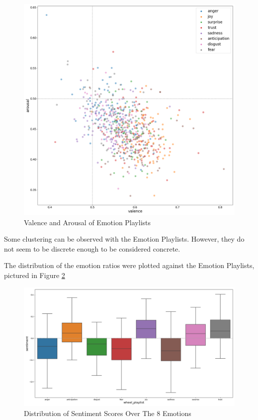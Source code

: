 \documentclass[11pt]{article}
\begin{document}
\begin{figure}[!ht]
  \includegraphics[scale=0.35]{../statics/plots/va_wheel_playlist_False.png}
  \centering
  \caption{Valence and Arousal of Emotion Playlists}
  \label{fig:va_wheel}
\end{figure}
Some clustering can be observed with the Emotion Playlists. However, they do not seem to be discrete enough to be considered concrete.

The distribution of the emotion ratios were plotted against the Emotion Playlists, pictured in Figure \ref{fig:wheel_playlist}

\begin{figure}[!ht]
  \includegraphics[scale=0.42]{../statics/plots/wheel_playlist.png}
  \centering
  \caption{Distribution of Sentiment Scores Over The 8 Emotions}
  \label{fig:wheel_playlist}
\end{figure}
\end{document}
